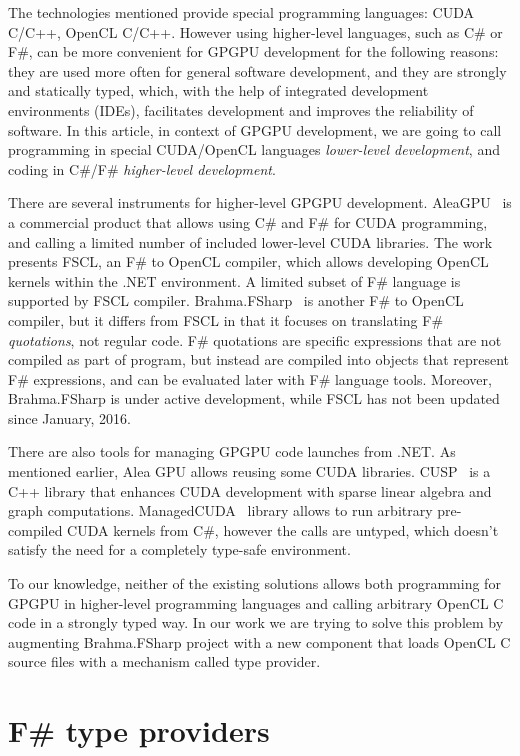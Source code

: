 \documentclass[sigplan,review]{acmart}\settopmatter{printfolios=true}
\begin{document}
The technologies mentioned provide special programming languages: CUDA C/C++, OpenCL C/C++. However using higher-level languages, such as C\# or F\#, can be more convenient for GPGPU development for the following reasons: they are used more often for general software development, and they are strongly and statically typed, which, with the help of integrated development environments (IDEs), facilitates development and improves the reliability of software. In this article, in context of GPGPU development, we are going to call programming in special CUDA/OpenCL languages \textit{lower-level development}, and coding in C\#/F\# \textit{higher-level development}.

There are several instruments for higher-level GPGPU development. AleaGPU~\cite{AleaGPU} is a commercial product that allows using C\# and F\# for CUDA programming, and calling a limited number of included lower-level CUDA libraries. The work~\cite{FSCL} presents FSCL, an F\# to OpenCL compiler, which allows developing OpenCL kernels within the .NET environment. A limited subset of F\# language is supported by FSCL compiler. Brahma.FSharp~\cite{Brahma_FSharp} is another F\# to OpenCL compiler, but it differs from FSCL in that it focuses on translating F\# \textit{quotations}, not regular code. F\# quotations are specific expressions that are not compiled as part of program, but instead are compiled into objects that represent F\# expressions, and can be evaluated later with F\# language tools. Moreover, Brahma.FSharp is under active development, while FSCL has not been updated since January, 2016.

There are also tools for managing GPGPU code launches from .NET. As mentioned earlier, Alea GPU allows reusing some CUDA libraries. CUSP~\cite{CUSP} is a C++ library that enhances CUDA development with sparse linear algebra and graph computations. ManagedCUDA~\cite{ManagedCUDA} library allows to run arbitrary pre-compiled CUDA kernels from C\#, however the calls are untyped, which doesn't satisfy the need for a completely type-safe environment.

To our knowledge, neither of the existing solutions allows both programming for GPGPU in higher-level programming languages and calling arbitrary OpenCL C code in a strongly typed way. In our work we are trying to solve this problem by augmenting Brahma.FSharp project with a new component that loads OpenCL C source files with a mechanism called type provider.

\section{F\# type providers}
\end{document}
